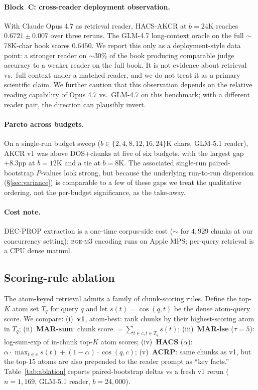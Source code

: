\documentclass{article}
\theoremstyle{plain}
\theoremstyle{definition}
\theoremstyle{remark}
\begin{document}
\paragraph{Block~C: cross-reader deployment observation.}
\label{sec:crossreader-note}
With Claude Opus 4.7 as retrieval reader, HACS-AKCR at $b\!=\!24$K reaches
$0.6721 \pm 0.007$ over three reruns. The GLM-4.7 long-context oracle on
the full $\sim$78K-char book scores $0.6450$. We report this only as a
deployment-style data point: a stronger reader on $\sim$30\% of the book
producing comparable judge accuracy to a weaker reader on the full book.
It is not evidence about retrieval vs.\ full context under a matched reader,
and we do not treat it as a primary scientific claim. We further caution
that this observation depends on the relative reading capability of Opus
4.7 vs.\ GLM-4.7 on this benchmark; with a different reader pair, the
direction can plausibly invert.

\paragraph{Pareto across budgets.} On a single-run budget sweep
($b\!\in\!\{2,4,8,12,16,24\}$K chars, GLM-5.1 reader), AKCR v1 was above
DOS+chunks at five of six budgets, with the largest gap $+8.3$pp at
$b\!=\!12$K and a tie at $b\!=\!8$K. The associated single-run
paired-bootstrap $P$-values look strong, but because the underlying
run-to-run dispersion (\S\ref{sec:variance}) is comparable to a few of these
gaps we treat the qualitative ordering, not the per-budget significance,
as the take-away.

\paragraph{Cost note.} DEC-PROP extraction is a one-time corpus-side cost
($\sim$ for $4{,}929$ chunks at our concurrency setting);
\textsc{bge-m3} encoding runs on Apple MPS; per-query retrieval is a CPU
dense matmul.

\subsection{Scoring-rule ablation}
\label{sec:ablation}
The atom-keyed retrieval admits a family of chunk-scoring rules. Define the
top-$K$ atom set $T_q$ for query $q$ and let $s(t)\!=\!\cos(q,t)$ be the dense
atom-query score. We compare:
(i)~\textbf{v1}, atom-best: rank chunks by their highest-scoring atom in $T_q$;
(ii)~\textbf{MAR-sum}: chunk score $=\!\sum_{t \in c, t \in T_q} s(t)$;
(iii)~\textbf{MAR-lse} ($\tau\!=\!5$): log-sum-exp of in-chunk top-$K$ atom scores;
(iv)~\textbf{HACS} ($\alpha$): $\alpha \cdot \max_{t\in c}s(t) + (1\!-\!\alpha)\cdot\cos(q,c)$;
(v)~\textbf{ACRP}: same chunks as v1, but the top-15 atoms are also prepended
to the reader prompt as ``key facts.''
Table~\ref{tab:ablation} reports paired-bootstrap deltas vs a fresh v1 rerun
($n\!=\!1{,}169$, GLM-5.1 reader, $b\!=\!24{,}000$).
\end{document}
